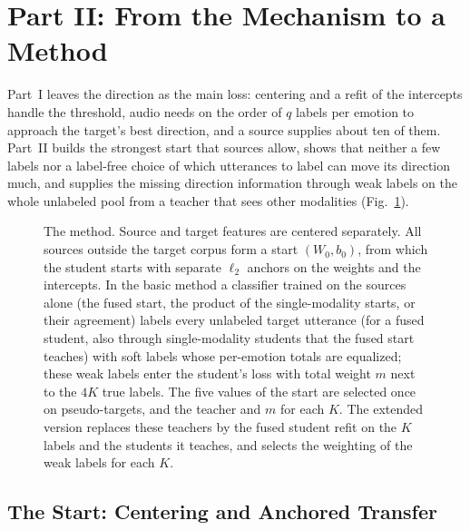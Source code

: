 \section{Part II: From the Mechanism to a Method}
\label{sec:part2-mechanism-to-method}

Part~I leaves the direction as the main loss: centering and a refit of the intercepts handle the threshold, audio needs on the order of $q$ labels per emotion to approach the target's best direction, and a source supplies about ten of them.
Part~II builds the strongest start that sources allow, shows that neither a few labels nor a label-free choice of which utterances to label can move its direction much, and supplies the missing direction information through weak labels on the whole unlabeled pool from a teacher that sees other modalities (Fig.~\ref{fig:method}).

\begin{figure}[t]
\centering
{}
\caption{The method. Source and target features are centered separately. All sources outside the target corpus form a start $(W_0, b_0)$, from which the student starts with separate $\ell_2$ anchors on the weights and the intercepts. In the basic method a classifier trained on the sources alone (the fused start, the product of the single-modality starts, or their agreement) labels every unlabeled target utterance (for a fused student, also through single-modality students that the fused start teaches) with soft labels whose per-emotion totals are equalized; these weak labels enter the student's loss with total weight $m$ next to the $4K$ true labels. The five values of the start are selected once on pseudo-targets, and the teacher and $m$ for each $K$. The extended version replaces these teachers by the fused student refit on the $K$ labels and the students it teaches, and selects the weighting of the weak labels for each $K$.}
\label{fig:method}
\end{figure}

\subsection{The Start: Centering and Anchored Transfer}
\label{sec:part2-start}


